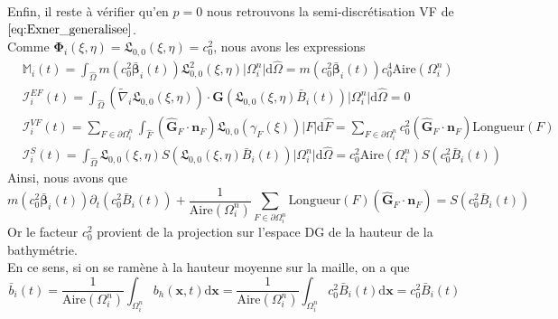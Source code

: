 \documentclass[11pt, a4paper, oneside]{report}
\newcommand{\LegendreL}{\mathfrak{L}}
\begin{document}
Enfin, il reste à vérifier qu'en $p = 0$ nous retrouvons la semi-discrétisation VF de $\eqref{eq:Exner_generalisee}$. \\
Comme $\bm{\Phi}_i(\xi, \eta) = \LegendreL_{0, 0}(\xi, \eta) = c_0^2$, nous avons les expressions
\begin{equation}
    \begin{aligned}
        & \mathbb{M}_i(t) = \int_{\widehat{\Omega}} m \left( c_0^2 \bm{\bar{\beta}}_i(t) \right) \LegendreL_{0, 0}^2(\xi, \eta) \lvert \Omega_i^n \rvert \text{d}\widehat{\Omega} = m \left( c_0^2 \bm{\bar{\beta}}_i(t) \right) c_0^4 \text{Aire} \left( \Omega_i^n \right) \\
        & \bm{\mathcal{I}}_i^{EF}(t) = \int_{\widehat{\Omega}} \left( \widetilde{\nabla}_i \LegendreL_{0, 0}(\xi, \eta) \right) \cdot \bm{G} \left( \LegendreL_{0, 0}(\xi, \eta) \bar{B}_i(t) \right) \lvert \Omega_i^n \rvert \text{d}\widehat{\Omega} = 0 \\
        & \bm{\mathcal{I}}_i^{VF}(t) = \sum_{F \in \partial \Omega_i^n} \int_{\widehat{F}} \left( \bm{\widehat{G}}_F \cdot \bm{n}_F \right) \LegendreL_{0, 0}(\gamma_F(\xi)) \lvert F \rvert \text{d}\widehat{F} = \sum_{F \in \partial \Omega_i^n} c_0^2 \left( \bm{\widehat{G}}_F \cdot \bm{n}_F \right) \text{Longueur}(F) \\
        & \bm{\mathcal{I}}_i^S(t) = \int_{\widehat{\Omega}} \LegendreL_{0, 0}(\xi, \eta) S \left( \LegendreL_{0, 0}(\xi, \eta) \bar{B}_i(t) \right) \lvert \Omega_i^n \rvert \text{d}\widehat{\Omega} = c_0^2 \text{Aire} \left( \Omega_i^n \right) S \left( c_0^2 \bar{B}_i(t) \right)
    \end{aligned}
\end{equation}
Ainsi, nous avons que
\begin{equation}
    m \left( c_0^2 \bm{\bar{\beta}}_i(t) \right) \partial_t \left( c_0^2 \bar{B}_i(t) \right) + \frac{1}{\text{Aire}\left( \Omega_i^n \right)} \sum_{F \in \partial \Omega_i^n} \text{Longueur}(F) \left( \bm{\widehat{G}}_F \cdot \bm{n}_F \right) = S \left( c_0^2 \bar{B}_i(t) \right)
\end{equation}
Or le facteur $c_0^2$ provient de la projection sur l'espace DG de la hauteur de la bathymétrie. \\
En ce sens, si on se ramène à la hauteur moyenne sur la maille, on a que
\begin{equation}
    \bar{b}_i(t) = \frac{1}{\text{Aire}\left( \Omega_i^n \right)} \int_{\Omega_i^n} b_h(\bm{x}, t) \text{d}\bm{x} = \frac{1}{\text{Aire}\left( \Omega_i^n \right)} \int_{\Omega_i^n} c_0^2 \bar{B}_i(t) \text{d}\bm{x} = c_0^2 \bar{B}_i(t)
\end{equation}
\end{document}
